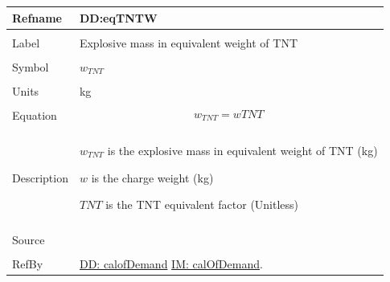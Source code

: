 \documentclass[12pt]{article}
\begin{document}
\noindent \begin{minipage}{\textwidth}
\begin{tabular}{p{} p{}}
\toprule \textbf{Refname} & \textbf{DD:eqTNTW}
\label{DD:eqTNTW}
\\ \midrule \\
Label & Explosive mass in equivalent weight of TNT
\\ \midrule \\
Symbol & ${w_{TNT}}$
\\ \midrule \\
Units & kg
\\ \midrule \\
Equation & \begin{displaymath}
           {w_{TNT}}=w TNT
           \end{displaymath}
\\ \midrule \\
Description & \begin{symbDescription}
              \item{${w_{TNT}}$ is the explosive mass in equivalent weight of TNT (kg)}
              \item{$w$ is the charge weight (kg)}
              \item{$TNT$ is the TNT equivalent factor (Unitless)}
              \end{symbDescription}
\\ \midrule \\
Source & \cite{astm2009}
\\ \midrule \\
RefBy & \hyperref[DD:calofDemand]{DD: calofDemand} \hyperref[IM:calOfDemand]{IM: calOfDemand}.
\\ \bottomrule \end{tabular}
\end{minipage}
\par~
\end{document}

